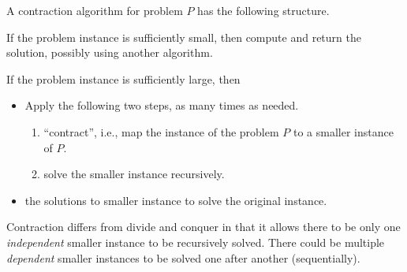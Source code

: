 \begin{cluster}
\label{grp:def:design::contraction}

\begin{definition}[Contraction]
\label{def:design::contraction}

A contraction algorithm for problem $P$ has the following structure.

\begin{description}[topsep=1pt,itemsep=1pt]

\item[Base Case:] If the problem instance is sufficiently small, then
  compute and return the solution, possibly using another algorithm.

\item[Inductive Step(s):] If the problem instance is sufficiently large,
  then 


\begin{itemize}
\item 
Apply the following two steps, as many  times as needed.

\begin{enumerate}[topsep=1pt,itemsep=1pt]
\item {} 
``contract'', i.e., map the instance of the problem $P$ to a smaller
  instance of $P$.

\item {}
solve the smaller instance recursively.
\end{enumerate}

\item
{} the solutions to smaller instance to solve the original
instance.

\end{itemize}
\end{description}

\end{definition}
\end{cluster}

\begin{cluster}
\label{grp:rmrk:design::contraction::contraction}

\begin{remark}
\label{rmrk:design::contraction::contraction}
Contraction differs from divide and conquer in that it allows there to
be only one \emph{independent} smaller instance to be recursively
solved.
There could be multiple \emph{dependent} smaller instances to be
solved one after another (sequentially).

\end{remark}
\end{cluster}

